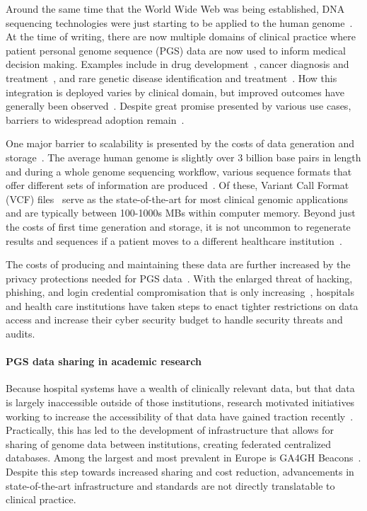 \documentclass[a4paper,11pt]{article}
\begin{document}
\begin{refsection}
Around the same time that the World Wide Web was being established, DNA sequencing technologies were just starting to be applied to the human genome~\cite{hood_1987}.
At the time of writing, there are now multiple domains of clinical practice where patient personal genome sequence (PGS) data are now used to inform medical decision making. 
Examples include in drug development~\cite{ko_new_2022}, cancer diagnosis and treatment~\cite{mcleod_cancer_2013}, and rare genetic disease identification and treatment~\cite{souche_recommendations_2022}.
How this integration is deployed varies by clinical domain, but improved outcomes have generally been observed~\cite{mathur_personalized_2017}.
Despite great promise presented by various use cases, barriers to widespread adoption remain~\cite{stefanicka-wojtas_barriers_2023}.

One major barrier to scalability is presented by the costs of data generation and storage~\cite{genomics_cost_2023}.
The average human genome is slightly over 3 billion base pairs in length and during a whole genome sequencing workflow, various sequence formats that offer different sets of information are produced~\cite{bagger_whole_2024}.
Of these, Variant Call Format (VCF) files~\cite{danecek_variant_2011} serve as the state-of-the-art for most clinical genomic applications and are typically between 100-1000s MBs within computer memory. 
Beyond just the costs of first time generation and storage, it is not uncommon to regenerate results and sequences if a patient moves to a different healthcare institution~\cite{that one citiation}.

The costs of producing and maintaining these data are further increased by the privacy protections needed for PGS data~\cite{GDPR_2016}.
With the enlarged threat of hacking, phishing, and login credential compromisation that is only increasing~\cite{noauthor_ransomware_nodate}, hospitals and health care institutions have taken steps to enact tighter restrictions on data access and increase their cyber security budget to handle security threats and audits.


\paragraph{PGS data sharing in academic research}
Because hospital systems have a wealth of clinically relevant data, but that data is largely inaccessible outside of those institutions, research motivated initiatives working to increase the accessibility of that data have gained traction recently~\cite{data_sharing_2019}.
Practically, this has led to the development of infrastructure that allows for sharing of genome data between institutions, creating federated centralized databases. 
Among the largest and most prevalent in Europe is GA4GH Beacons~\cite{rambla_beacon_2022}. 
Despite this step towards increased sharing and cost reduction, advancements in state-of-the-art infrastructure and standards are not directly translatable to clinical practice. 



\end{refsection}
\end{document}
